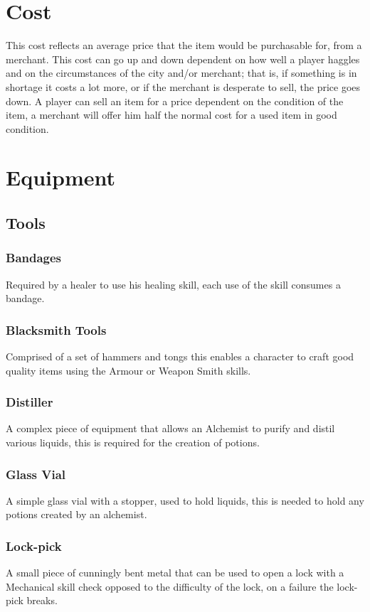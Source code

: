 \section{Cost}
This cost reflects an average price that the item would be purchasable for, from a merchant. This cost can go up and down dependent on how well a player haggles and on the circumstances of the city and/or merchant; that is, if something is in shortage it costs a lot more, or if the merchant is desperate to sell, the price goes down. A player can sell an item for a price dependent on the condition of the item, a merchant will offer him half the normal cost for a used item in good condition.

\section{Equipment}
\subsection{Tools}

\subsubsection*{Bandages}
Required by a healer to use his healing skill, each use of the skill consumes a bandage.

\subsubsection*{Blacksmith Tools}
Comprised of a set of hammers and tongs this enables a character to craft good quality items using the Armour or Weapon Smith skills.

\subsubsection*{Distiller}
A complex piece of equipment that allows an Alchemist to purify and distil various liquids, this is required for the creation of potions.

\subsubsection*{Glass Vial}
A simple glass vial with a stopper, used to hold liquids, this is needed to hold any potions created by an alchemist.

\subsubsection*{Lock-pick}
A small piece of cunningly bent metal that can be used to open a lock with a Mechanical skill check opposed to the difficulty of the lock, on a failure the lock-pick breaks.

